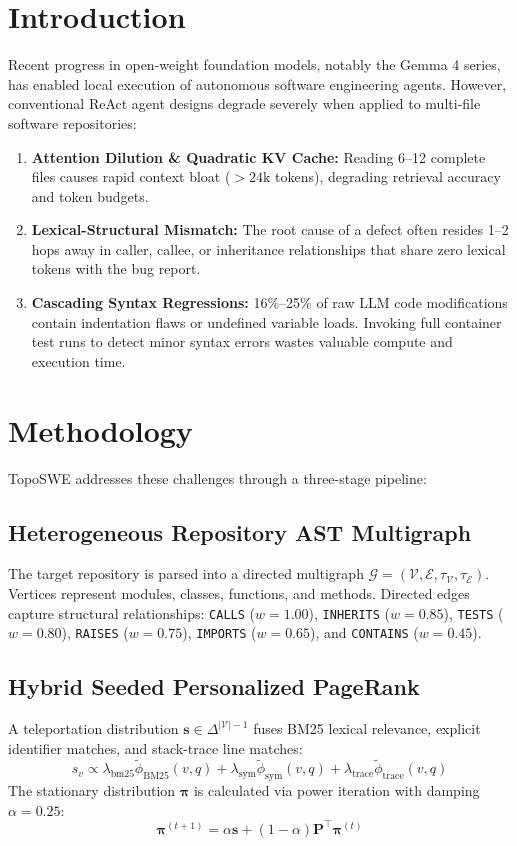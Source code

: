 \documentclass[11pt,a4paper]{article}
\begin{document}
\section{Introduction}
Recent progress in open-weight foundation models, notably the Gemma 4 series, has enabled local execution of autonomous software engineering agents. However, conventional ReAct agent designs degrade severely when applied to multi-file software repositories:
\begin{enumerate}
    \item \textbf{Attention Dilution \& Quadratic KV Cache:} Reading 6--12 complete files causes rapid context bloat ($>24\text{k}$ tokens), degrading retrieval accuracy and token budgets.
    \item \textbf{Lexical-Structural Mismatch:} The root cause of a defect often resides 1--2 hops away in caller, callee, or inheritance relationships that share zero lexical tokens with the bug report.
    \item \textbf{Cascading Syntax Regressions:} 16\%--25\% of raw LLM code modifications contain indentation flaws or undefined variable loads. Invoking full container test runs to detect minor syntax errors wastes valuable compute and execution time.
\end{enumerate}

\section{Methodology}
TopoSWE addresses these challenges through a three-stage pipeline:
\subsection{Heterogeneous Repository AST Multigraph}
The target repository is parsed into a directed multigraph $\mathcal{G} = (\mathcal{V}, \mathcal{E}, \tau_{\mathcal{V}}, \tau_{\mathcal{E}})$. Vertices represent modules, classes, functions, and methods. Directed edges capture structural relationships: \texttt{CALLS} ($w=1.00$), \texttt{INHERITS} ($w=0.85$), \texttt{TESTS} ($w=0.80$), \texttt{RAISES} ($w=0.75$), \texttt{IMPORTS} ($w=0.65$), and \texttt{CONTAINS} ($w=0.45$).

\subsection{Hybrid Seeded Personalized PageRank}
A teleportation distribution $\mathbf{s} \in \Delta^{|\mathcal{V}|-1}$ fuses BM25 lexical relevance, explicit identifier matches, and stack-trace line matches:
\begin{equation}
s_v \propto \lambda_{\text{bm25}} \tilde{\phi}_{\text{BM25}}(v, q) + \lambda_{\text{sym}} \tilde{\phi}_{\text{sym}}(v, q) + \lambda_{\text{trace}} \tilde{\phi}_{\text{trace}}(v, q)
\end{equation}
The stationary distribution $\boldsymbol{\pi}$ is calculated via power iteration with damping $\alpha = 0.25$:
\begin{equation}
\boldsymbol{\pi}^{(t+1)} = \alpha \mathbf{s} + (1 - \alpha) \mathbf{P}^{\top} \boldsymbol{\pi}^{(t)}
\end{equation}
\end{document}
